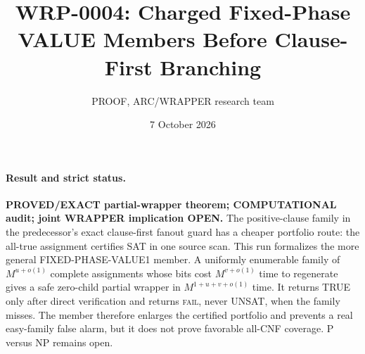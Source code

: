 \documentclass[11pt]{article}
\title{WRP-0004: Charged Fixed-Phase VALUE Members Before Clause-First Branching}
\author{PROOF, ARC/WRAPPER research team}
\date{7 October 2026}
\begin{document}
\maketitle

\paragraph{Result and strict status.}
\textbf{PROVED/EXACT partial-wrapper theorem; COMPUTATIONAL audit; joint
WRAPPER implication OPEN.}
The positive-clause family in the predecessor's exact clause-first fanout
guard has a cheaper portfolio route: the all-true assignment certifies SAT
in one source scan.  This run formalizes the more general
FIXED-PHASE-VALUE1 member.  A uniformly enumerable family of
$M^{u+o(1)}$ complete assignments whose bits cost $M^{v+o(1)}$ time to
regenerate gives a safe zero-child partial wrapper in
$M^{1+u+v+o(1)}$ time.  It returns TRUE only after direct verification and
returns \textsc{fail}, never UNSAT, when the family misses.  The member
therefore enlarges the certified portfolio and prevents a real
easy-family false alarm, but it does not prove favorable all-CNF coverage.
P versus NP remains open.
\end{document}
